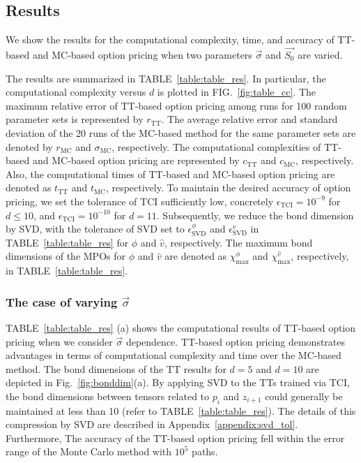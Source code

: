 \subsection{Results}
We show the results for the computational complexity, time, and accuracy of TT-based and MC-based option pricing when two parameters $\vec{\sigma}$ and $\vec{S_0}$ are varied.

The results are summarized in TABLE~\ref{table:table_res}. 
In particular, the computational complexity versus $d$ is plotted in FIG.~\ref{fig:table_cc}.
The maximum relative error of TT-based option pricing among runs for 100 random parameter sets is represented by $r_{\mathrm{TT}}$. 
The average relative error and standard deviation of the 20 runs of the MC-based method for the same parameter sets are denoted by $r_{\mathrm{MC}}$ and $\sigma_{\text{MC}}$, respectively. 
The computational complexities of TT-based and MC-based option pricing are represented by $c_{\mathrm{TT}}$ and $c_{\mathrm{MC}}$, respectively.
Also, the computational times of TT-based and MC-based option pricing are denoted as $t_{\mathrm{TT}}$ and $t_{\mathrm{MC}}$, respectively.
To maintain the desired accuracy of option pricing, we set the tolerance of TCI sufficiently low, concretely $\epsilon_{\mathrm{TCI}} = 10^{-9}$ for $d \leq 10$, and $\epsilon_{\mathrm{TCI}} = 10^{-10}$ for $d=11$.
Subsequently, we reduce the bond dimension by SVD, with
the tolerance of SVD set to  $\epsilon_{\mathrm{SVD}}^\phi$ and $\epsilon_{\mathrm{SVD}}^v$ in TABLE~\ref{table:table_res} for $\phi$ and $\hat{v}$, respectively.
The maximum bond dimensions of the MPOs for $\phi$ and $\hat{v}$ are denoted as $\chi^{\phi}_{\mathrm{max}}$ and $\chi^{\hat{v}}_{\mathrm{max}}$, respectively, in TABLE~\ref{table:table_res}.


\subsubsection{The case of varying $\vec{\sigma}$}
TABLE~\ref{table:table_res} (a) shows the computational results of TT-based option pricing when we consider $\vec{\sigma}$ dependence.
TT-based option pricing demonstrates advantages in terms of computational complexity and time over the MC-based method.
The bond dimensions of the TT results for $d=5$ and $d=10$ are depicted in Fig.~\ref{fig:bonddim}(a). 
By applying SVD to the TTs trained via TCI, the bond dimensions between tensors related to $p_i$ and $z_{i+1}$ could generally be maintained at less than 10 (refer to TABLE~\ref{table:table_res}). 
The details of this compression by SVD are described in Appendix~\ref{appendix:svd_tol}.
Furthermore, The accuracy of the TT-based option pricing fell within the error range of the Monte Carlo method with $10^5$ paths. 






